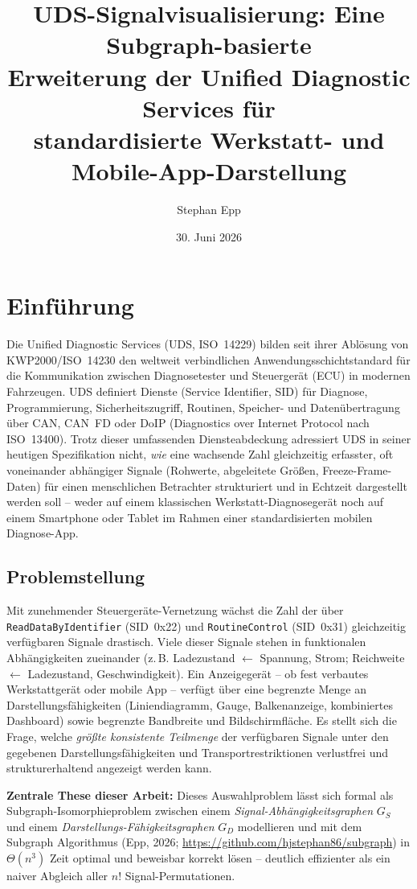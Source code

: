 ﻿\documentclass[a4paper,12pt]{article}
\title{UDS-Signalvisualisierung: Eine Subgraph-basierte\\
Erweiterung der Unified Diagnostic Services für\\
standardisierte Werkstatt- und Mobile-App-Darstellung}
\author{Stephan Epp}
\date{30. Juni 2026}
\theoremstyle{definition}
\begin{document}
\maketitle

\tableofcontents
\newpage

\section{Einführung}

Die Unified Diagnostic Services (UDS, ISO~14229) bilden seit ihrer Ablösung von KWP2000/ISO~14230 den weltweit verbindlichen Anwendungsschichtstandard für die Kommunikation zwischen Diagnosetester und Steuergerät (ECU) in modernen Fahrzeugen. UDS definiert Dienste (Service Identifier, SID) für Diagnose, Programmierung, Sicherheitszugriff, Routinen, Speicher- und Datenübertragung über CAN, CAN~FD oder DoIP (Diagnostics over Internet Protocol nach ISO~13400). Trotz dieser umfassenden Diensteabdeckung adressiert UDS in seiner heutigen Spezifikation nicht, \emph{wie} eine wachsende Zahl gleichzeitig erfasster, oft voneinander abhängiger Signale (Rohwerte, abgeleitete Größen, Freeze-Frame-Daten) für einen menschlichen Betrachter strukturiert und in Echtzeit dargestellt werden soll -- weder auf einem klassischen Werkstatt-Diagnosegerät noch auf einem Smartphone oder Tablet im Rahmen einer standardisierten mobilen Diagnose-App.

\subsection{Problemstellung}

Mit zunehmender Steuergeräte-Vernetzung wächst die Zahl der über \texttt{ReadDataByIdentifier} (SID~0x22) und \texttt{RoutineControl} (SID~0x31) gleichzeitig verfügbaren Signale drastisch. Viele dieser Signale stehen in funktionalen Abhängigkeiten zueinander (z.\,B. Ladezustand $\leftarrow$ Spannung, Strom; Reichweite $\leftarrow$ Ladezustand, Geschwindigkeit). Ein Anzeigegerät -- ob fest verbautes Werkstattgerät oder mobile App -- verfügt über eine begrenzte Menge an Darstellungsfähigkeiten (Liniendiagramm, Gauge, Balkenanzeige, kombiniertes Dashboard) sowie begrenzte Bandbreite und Bildschirmfläche. Es stellt sich die Frage, welche \emph{größte konsistente Teilmenge} der verfügbaren Signale unter den gegebenen Darstellungsfähigkeiten und Transportrestriktionen verlustfrei und strukturerhaltend angezeigt werden kann.

\textbf{Zentrale These dieser Arbeit:} Dieses Auswahlproblem lässt sich formal als Subgraph-Isomorphieproblem zwischen einem \emph{Signal-Abhängigkeitsgraphen} $G_S$ und einem \emph{Darstellungs-Fähigkeitsgraphen} $G_D$ modellieren und mit dem Subgraph Algorithmus (Epp, 2026; \url{https://github.com/hjstephan86/subgraph}) in $\Theta(n^3)$ Zeit optimal und beweisbar korrekt lösen -- deutlich effizienter als ein naiver Abgleich aller $n!$ Signal-Permutationen.
\end{document}
